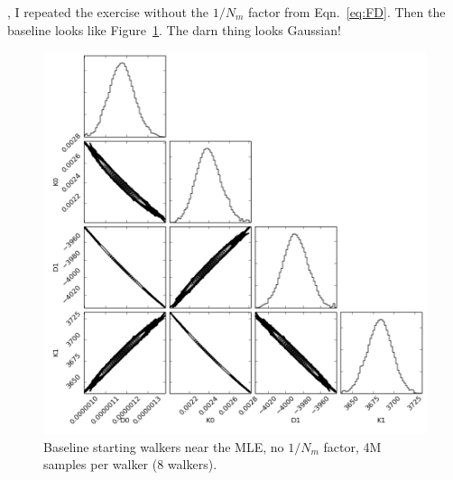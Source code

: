 \documentclass{tufte-handout}
\begin{document}
, I repeated
the exercise without the $1/N_m$ factor from Eqn.~\ref{eq:FD}. Then the
baseline looks like Figure~\ref{fig:baseline_nonorm}. The darn thing looks Gaussian!
\begin{figure}
    \includegraphics[width=\columnwidth]{figs/baseline_no_norm/triangle_global.png}
    \caption{Baseline starting walkers near the MLE, no $1/N_m$ factor, 4M samples per walker (8 walkers).}
  \label{fig:baseline_nonorm}
\end{figure}
\end{document}
